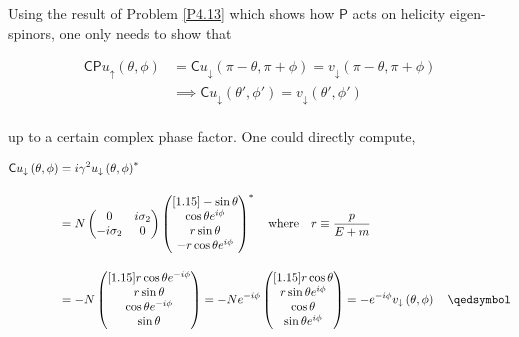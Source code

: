 \begin{solution}
Using the result of Problem \ref{P4.13} which shows how $\mathsf{P}$ acts on helicity eigen-spinors, one only needs to show that 

\begin{align*}
    \mathsf{CP} u_\uparrow \left( \theta,\phi \right) &=   \mathsf{C} u_\downarrow \left( \pi- \theta, \pi+ \phi \right) = v_\downarrow \left( \pi- \theta, \pi+ \phi \right) \\[0.15in]
    &\implies \mathsf{C} u_\downarrow \left( \theta',   \phi' \right) = v_\downarrow \left( \theta',   \phi' \right) \nonumber 
\end{align*}\\
up to a certain complex phase factor. One could directly compute,

\begin{align*}
    \mathsf{C} u_\downarrow \left( \theta,  \phi \right) &= i\gamma^2 u_\downarrow \left( \theta,  \phi \right)^\ast \\[0.15in]
                &= N \begin{pmatrix}
                    0 & i\sigma_2  \\
                    -i\sigma_2 & 0 
                \end{pmatrix}\begin{pmatrix}[1.15]
                    -\sin\theta \\
                    \cos \theta e^{i\phi} \\
                    r\sin\theta \\
                    -r\cos \theta e^{i\phi}
                \end{pmatrix}^\ast \quad \text{where} \quad r \equiv \frac{p}{E+m} \\[0.15in]
                &= -N \begin{pmatrix}[1.15]
                    r\cos\theta e^{-i\phi}\\
                    r\sin \theta  \\
                    \cos\theta e^{-i\phi} \\
                    \sin \theta 
                \end{pmatrix} = -N e^{-i\phi} \begin{pmatrix}[1.15]
                    r\cos\theta \\
                    r\sin \theta e^{i\phi}  \\
                    \cos\theta  \\
                    \sin \theta e^{i\phi} 
                \end{pmatrix} = -e^{-i\phi} v_\downarrow \left(\theta,\phi\right) \qed
\end{align*}
\end{solution}

